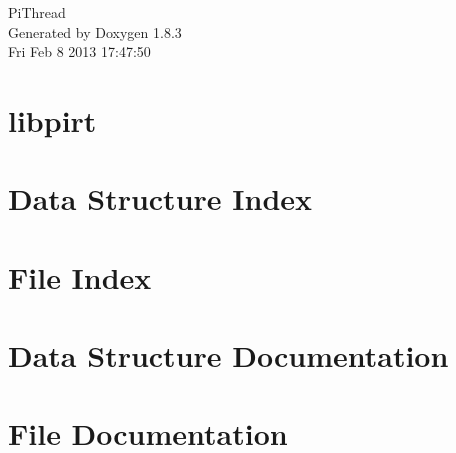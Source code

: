 \documentclass{book}
\begin{document}
\hypersetup{pageanchor=false,citecolor=blue}
\begin{titlepage}
\vspace*{7cm}
\begin{center}
{\Large Pi\-Thread }\\
\vspace*{1cm}
{\large Generated by Doxygen 1.8.3}\\
\vspace*{0.5cm}
{\small Fri Feb 8 2013 17:47:50}\\
\end{center}
\end{titlepage}
\clearemptydoublepage
{}
\tableofcontents
\clearemptydoublepage
{}
\hypersetup{pageanchor=true,citecolor=blue}
\chapter{libpirt}
\label{md_README}
\hypertarget{md_README}{}

\chapter{Data Structure Index}

\chapter{File Index}

\chapter{Data Structure Documentation}






















\chapter{File Documentation}





































\printindex
\end{document}
